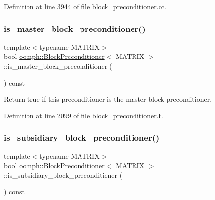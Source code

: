 Definition at line 3944 of file block\+\_\+preconditioner.\+cc.

\mbox{\label{classoomph_1_1BlockPreconditioner_a804e1975f170d2ad941b3b7d2dd50407}} 
\subsubsection{\texorpdfstring{is\+\_\+master\+\_\+block\+\_\+preconditioner()}{is\_master\_block\_preconditioner()}}
{\footnotesize\ttfamily template$<$typename M\+A\+T\+R\+IX$>$ \\
bool \hyperlink{classoomph_1_1BlockPreconditioner}{oomph\+::\+Block\+Preconditioner}$<$ M\+A\+T\+R\+IX $>$\+::is\+\_\+master\+\_\+block\+\_\+preconditioner (\begin{DoxyParamCaption}{ }\end{DoxyParamCaption}) const\hspace{0.3cm}{\ttfamily [inline]}}



Return true if this preconditioner is the master block preconditioner. 



Definition at line 2099 of file block\+\_\+preconditioner.\+h.

\mbox{\label{classoomph_1_1BlockPreconditioner_a9ac4335ec07fc13f7bf1093fd0489c52}} 
\subsubsection{\texorpdfstring{is\+\_\+subsidiary\+\_\+block\+\_\+preconditioner()}{is\_subsidiary\_block\_preconditioner()}}
{\footnotesize\ttfamily template$<$typename M\+A\+T\+R\+IX$>$ \\
bool \hyperlink{classoomph_1_1BlockPreconditioner}{oomph\+::\+Block\+Preconditioner}$<$ M\+A\+T\+R\+IX $>$\+::is\+\_\+subsidiary\+\_\+block\+\_\+preconditioner (\begin{DoxyParamCaption}{ }\end{DoxyParamCaption}) const\hspace{0.3cm}{\ttfamily [inline]}}



